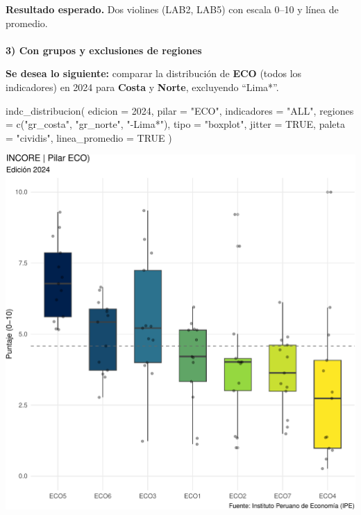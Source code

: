 \documentclass[
  11pt,
  letterpaper,
  DIV=11,
  numbers=noendperiod]{scrartcl}
\makeatletter
\let\oldparagraph\paragraph
\renewcommand{\paragraph}{
    \@ifstar
      \xxxParagraphStar
      \xxxParagraphNoStar
  }
\newcommand{\xxxParagraphStar}[1]{\oldparagraph*{#1}\mbox{}}
\newcommand{\xxxParagraphNoStar}[1]{\oldparagraph{#1}\mbox{}}
\newenvironment{Shaded}{\begin{snugshade}}{\end{snugshade}}
\newcommand{\AttributeTok}[1]{\textcolor[rgb]{0.40,0.45,0.13}{#1}}
\newcommand{\ConstantTok}[1]{\textcolor[rgb]{0.56,0.35,0.01}{#1}}
\newcommand{\DecValTok}[1]{\textcolor[rgb]{0.68,0.00,0.00}{#1}}
\newcommand{\FunctionTok}[1]{\textcolor[rgb]{0.28,0.35,0.67}{#1}}
\newcommand{\NormalTok}[1]{\textcolor[rgb]{0.00,0.23,0.31}{#1}}
\newcommand{\StringTok}[1]{\textcolor[rgb]{0.13,0.47,0.30}{#1}}
\makeatother
\begin{document}
\textbf{Resultado esperado.} Dos violines (LAB2, LAB5) con escala 0--10
y línea de promedio.

\paragraph{\texorpdfstring{\textbf{3) Con grupos y exclusiones de
regiones}}{3) Con grupos y exclusiones de regiones}}\label{con-grupos-y-exclusiones-de-regiones-1}

\textbf{Se desea lo siguiente:} comparar la distribución de \textbf{ECO}
(todos los indicadores) en 2024 para \textbf{Costa} y \textbf{Norte},
excluyendo ``Lima*''.

\begin{Shaded}
\begin{Highlighting}[]
\FunctionTok{indc\_distribucion}\NormalTok{(}
  \AttributeTok{edicion         =} \DecValTok{2024}\NormalTok{,}
  \AttributeTok{pilar           =} \StringTok{"ECO"}\NormalTok{,}
  \AttributeTok{indicadores     =} \StringTok{"ALL"}\NormalTok{,}
  \AttributeTok{regiones        =} \FunctionTok{c}\NormalTok{(}\StringTok{"gr\_costa"}\NormalTok{, }\StringTok{"gr\_norte"}\NormalTok{, }\StringTok{"{-}Lima*"}\NormalTok{),}
  \AttributeTok{tipo            =} \StringTok{"boxplot"}\NormalTok{,}
  \AttributeTok{jitter          =} \ConstantTok{TRUE}\NormalTok{,}
  \AttributeTok{paleta          =} \StringTok{"cividis"}\NormalTok{,}
  \AttributeTok{linea\_promedio  =} \ConstantTok{TRUE}
\NormalTok{)}
\end{Highlighting}
\end{Shaded}

\includegraphics{Manual_files/figure-pdf/unnamed-chunk-99-1.pdf}
\end{document}
